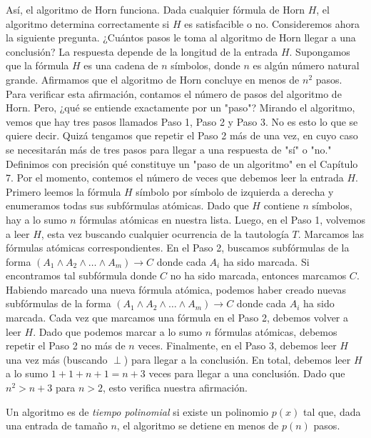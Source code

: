 \message{ !name(main.tex)}\documentclass[12pt,a4paper]{book}
\newcommand{\comillas}[1]{"#1"}
\begin{document}
    Así, el algoritmo de Horn funciona. Dada cualquier fórmula de Horn $H$, el algoritmo determina correctamente si $H$ es
    satisfacible o no. Consideremos ahora la siguiente pregunta. ¿Cuántos pasos le toma al algoritmo de Horn llegar a una
    conclusión? La respuesta depende de la longitud de la entrada $H$. Supongamos que la fórmula $H$ es una cadena de $n$
    símbolos, donde $n$ es algún número natural grande. Afirmamos que el algoritmo de Horn concluye en menos de $n^{2}$
    pasos.\\
    Para verificar esta afirmación, contamos el número de pasos del algoritmo de Horn. Pero, ¿qué se entiende exactamente
    por un \comillas{paso}? Mirando el algoritmo, vemos que hay tres pasos llamados Paso 1, Paso 2 y Paso 3. No es esto lo
    que se quiere decir. Quizá tengamos que repetir el Paso 2 más de una vez, en cuyo caso se necesitarán más de tres pasos
    para llegar a una respuesta de \comillas{sí} o \comillas{no.} Definimos con precisión qué constituye un \comillas{paso de
    un algoritmo} en el Capítulo 7. Por el momento, contemos el número de veces que debemos leer la entrada $H$.\\
    Primero leemos la fórmula $H$ símbolo por símbolo de izquierda a derecha y enumeramos todas sus subfórmulas atómicas.
    Dado que $H$ contiene $n$ símbolos, hay a lo sumo $n$ fórmulas atómicas en nuestra lista. Luego, en el Paso 1, volvemos a
    leer $H$, esta vez buscando cualquier ocurrencia de la tautología $T$. Marcamos las fórmulas atómicas correspondientes.
    En el Paso 2, buscamos subfórmulas de la forma $(A_{1}\wedge A_{2}\wedge\dots\wedge A_{m})\rightarrow C$ donde cada
    $A_{i}$ ha sido marcada. Si encontramos tal subfórmula donde $C$ no ha sido marcada, entonces marcamos $C$. Habiendo
    marcado una nueva fórmula atómica, podemos haber creado nuevas subfórmulas de la forma
    $(A_{1}\wedge A_{2}\wedge\dots\wedge A_{m})\rightarrow C$ donde cada $A_{i}$ ha sido marcada. Cada vez que marcamos una
    fórmula en el Paso 2, debemos volver a leer $H$. Dado que podemos marcar a lo sumo $n$ fórmulas atómicas, debemos repetir
    el Paso 2 no más de $n$ veces. Finalmente, en el Paso 3, debemos leer $H$ una vez más (buscando $\perp$) para llegar a la
    conclusión. En total, debemos leer $H$ a lo sumo $1+1+n+1=n+3$ veces para llegar a una conclusión. Dado que $n^{2}>n+3$
    para $n>2$, esto verifica nuestra afirmación.

    \begin{definicion}\label{def:tiempo-polinomial}
        Un algoritmo es de \textit{tiempo polinomial} si existe un polinomio $p(x)$ tal que, dada una entrada de tamaño $n$,
        el algoritmo se detiene en menos de $p(n)$ pasos.
    \end{definicion}
\end{document}
